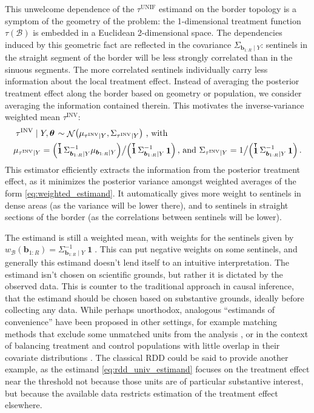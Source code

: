 \documentclass[letter,12pt]{article}
\DeclarePairedDelimiter{\parenthesis}{\lparen}{\rparen}
\newcommand{\del}[1]{\parenthesis*{#1}}
\DeclareMathOperator{\normal}{\mathcal{N}}
\DeclareMathOperator{\ones}{\mathbf{1}}
\newcommand*{\trans}{^{\mkern-1.5mu\intercal}}
\newcommand{\border}{\mathcal{B}}
\newcommand{\sentinel}{\bm{b}}
\newcommand{\numsent}{R}
\newcommand{\sentinels}{\sentinel_{1:\numsent}}
\newcommand{\unifavg}{\tau^{\mathrm{UNIF}}}
\newcommand{\invvar}{\tau^{\mathrm{INV}}}
\newcommand{\hyperparam}{\bm{\theta}}
\newcommand{\weightb}{w_{\border}}
\begin{document}
This unwelcome dependence of the \(\unifavg\) estimand on the border topology is a symptom of the geometry of the problem: the 1-dimensional treatment function \(\tau(\border)\) is embedded in a Euclidean 2-dimensional space.
The dependencies induced by this geometric fact are reflected in the covariance \(\Sigma_{\sentinels \mid Y}\): sentinels in the straight segment of the border will be less strongly correlated than in the sinuous segments.
The more correlated sentinels individually carry less information about the local treatment effect.
Instead of averaging the posterior treatment effect along the border based on geometry or population, we consider averaging the information contained therein.
This motivates the inverse-variance weighted mean \(\invvar\):
\begin{equation}
    \begin{split}
        & \left. \invvar \mid Y, \hyperparam \right. \sim \normal\del{\mu_{\invvar \mid Y}, \Sigma_{\invvar \mid Y}} ~ \text{, with} \\
        & \mu_{\invvar \mid Y} = \del{\ones\trans \Sigma_{\sentinels \mid Y}^{-1} \mu_{\sentinels \mid Y}} \big/ \del{\ones\trans \Sigma_{\sentinels \mid Y}^{-1} \ones} \,\textrm{, and }
        \Sigma_{\invvar \mid Y} = 1 \big/ \del{\ones\trans \Sigma_{\sentinels \mid Y}^{-1} \ones} \,.
    \end{split}
    \label{eq:invvar}
\end{equation}
This estimator efficiently extracts the information from the posterior treatment effect, as it minimizes the posterior variance amongst weighted averages of the form \eqref{eq:weighted_estimand}.
It automatically gives more weight to sentinels in dense areas (as the variance will be lower there), and to sentinels in straight sections of the border (as the correlations between sentinels will be lower).

The estimand is still a weighted mean, with weights for the sentinels given by \(\weightb(\sentinels) = \Sigma_{\sentinels \mid Y}^{-1} \ones\).
This can put negative weights on some sentinels, and generally this estimand doesn't lend itself to an intuitive interpretation.
The estimand isn't chosen on scientific grounds, but rather it is dictated by the observed data.
This is counter to the traditional approach in causal inference, that the estimand should be chosen based on substantive grounds, ideally before collecting any data.
While perhaps unorthodox, analogous ``estimands of convenience'' have been proposed in other settings, for example matching methods that exclude some unmatched units from the analysis \citep[discussed in][]{crump2009dealing}, or in the context of balancing treatment and control populations with little overlap in their covariate distributions \citep{li2016balancing}.
The classical RDD could be said to provide another example, as the estimand \eqref{eq:rdd_univ_estimand} focuses on the treatment effect near the threshold not because those units are of particular substantive interest, but because the available data restricts estimation of the treatment effect elsewhere.
\end{document}
